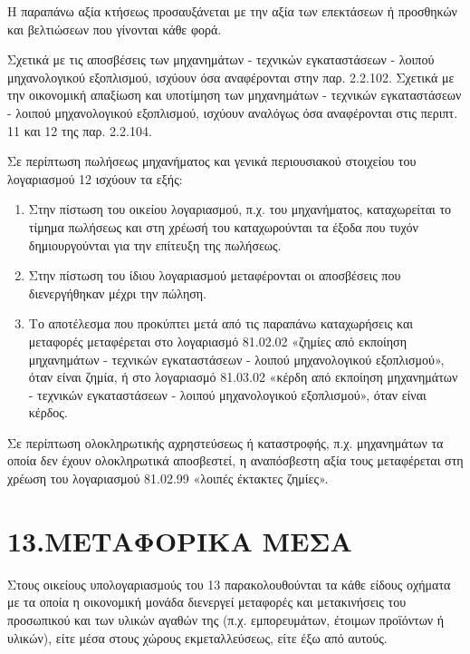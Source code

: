 \documentclass[A4,10pt,greek]{book}
\begin{document}
Η παραπάνω αξία κτήσεως προσαυξάνεται με την αξία των επεκτάσεων ή προσθηκών και βελτιώσεων που γίνονται κάθε φορά.

Σχετικά με τις αποσβέσεις των μηχανημάτων - τεχνικών εγκαταστάσεων - λοιπού μηχανολογικού εξοπλισμού, ισχύουν όσα αναφέρονται στην παρ. 2.2.102. Σχετικά με την οικονομική απαξίωση και υποτίμηση των μηχανημάτων - τεχνικών εγκαταστάσεων - λοιπού μηχανολογικού εξοπλισμού, ισχύουν αναλόγως όσα αναφέρονται στις περιπτ. 11 και 12 της παρ. 2.2.104.

Σε περίπτωση πωλήσεως μηχανήματος και γενικά περιουσιακού στοιχείου του λογαριασμού 12 ισχύουν τα εξής:

\begin{enumerate}

\item Στην πίστωση του οικείου λογαριασμού, π.χ. του μηχανήματος, καταχωρείται το τίμημα πωλήσεως και στη χρέωσή του καταχωρούνται τα έξοδα που τυχόν δημιουργούνται για την επίτευξη της πωλήσεως.

\item Στην πίστωση του ίδιου λογαριασμού μεταφέρονται οι αποσβέσεις που διενεργήθηκαν μέχρι την πώληση.

\item Το αποτέλεσμα που προκύπτει μετά από τις παραπάνω καταχωρήσεις και μεταφορές μεταφέρεται στο λογαριασμό 81.02.02 «ζημίες από εκποίηση μηχανημάτων - τεχνικών εγκαταστάσεων - λοιπού μηχανολογικού εξοπλισμού», όταν είναι ζημία, ή στο λογαριασμό 81.03.02 «κέρδη από εκποίηση μηχανημάτων - τεχνικών εγκαταστάσεων - λοιπού μηχανολογικού εξοπλισμού», όταν είναι κέρδος.

\end{enumerate}

Σε περίπτωση ολοκληρωτικής αχρηστεύσεως ή καταστροφής, π.χ. μηχανημάτων τα οποία δεν έχουν ολοκληρωτικά αποσβεστεί, η αναπόσβεστη αξία τους μεταφέρεται στη χρέωση του λογαριασμού 81.02.99 «λοιπές έκτακτες ζημίες».

\section{13.ΜΕΤΑΦΟΡΙΚΑ ΜΕΣΑ}

Στους οικείους υπολογαριασμούς του 13 παρακολουθούνται τα κάθε είδους οχήματα με τα οποία η οικονομική μονάδα διενεργεί μεταφορές και μετακινήσεις του προσωπικού και των υλικών αγαθών της (π.χ. εμπορευμάτων, έτοιμων προϊόντων ή υλικών), είτε μέσα στους χώρους εκμεταλλεύσεως, είτε έξω από αυτούς.
\end{document}
